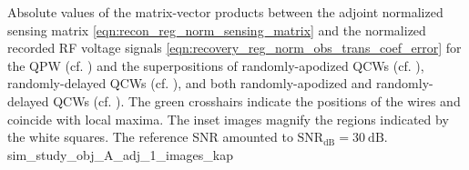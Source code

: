 %
{%
 Absolute values of
 the matrix-vector products between
 the adjoint normalized sensing matrix
 \eqref{eqn:recon_reg_norm_sensing_matrix} and
 the normalized recorded \ac{RF} voltage signals
 \eqref{eqn:recovery_reg_norm_obs_trans_coef_error} for
 the \acl{QPW}
 (cf. ) and
 the superpositions of
 randomly-apodized \acfp{QCW}
 (cf. ),
 randomly-delayed \acp{QCW}
 (cf. ), and both
 randomly-apodized and
 randomly-delayed \acp{QCW}
 (cf. ).
 The green crosshairs indicate
 the positions of
 the wires and coincide with
 local maxima.
 The inset images magnify
 the regions indicated by
 the white squares.
 The reference \ac{SNR} amounted to
 $\text{SNR}_{\text{dB}} = \SI{30}{\deci\bel}$.
}%
{sim_study_obj_A_adj_1_images_kap}


